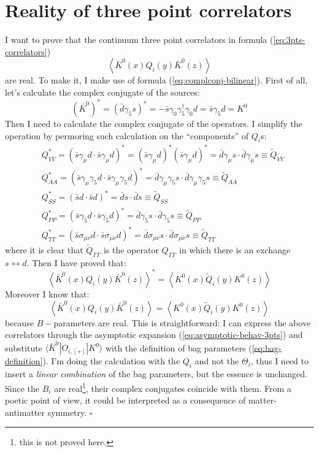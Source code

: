 \documentclass[english, LaM, oneside, noexaminfo]{sapthesis}
\newcommand{\la}{\langle}
\newcommand{\ra}{\rangle}
\newcommand{\proved}{\newline \hspace*{.97\textwidth} $\square$}
\begin{document}
\section{Reality of three point correlators}\label{app:proof-reality-3pts}
\noindent
I want to prove that the continuum three point correlators in formula (\ref{eq:3pts-correlators})
$$ \left\la \bar K^0 (x) Q_i (y) \bar K^0 (z) \right\ra $$
are real. To make it, I make use of formula (\ref{eq:complconj-bilinear}).
First of all, let's calculate the complex conjugate of the sources: 
\begin{equation*}
    (\bar K^{0})^* = (\bar d \gamma_5 s)^* = - \bar s \gamma_0 \gamma_5^\dagger \gamma_0 d = \bar s  \gamma_5 d = K^0
\end{equation*}
Then I need to calculate the complex conjugate of the operators.
I simplify the operation by permoring such calculation on the ``components'' of $Q_i$s:
\begin{equation*}
    \begin{aligned}
        & Q_{VV}^* = \left(\bar s \gamma_\mu d \cdot \bar s \gamma_\mu d\right)^* = \left(\bar s \gamma_\mu d\right)^* \left(\bar s \gamma_\mu d\right)^* = \bar d \gamma_\mu s \cdot \bar d \gamma_\mu s \equiv \tilde{Q}_{VV} \\
        & Q_{AA}^* = \left(\bar s \gamma_\mu \gamma_5 d \cdot \bar s \gamma_\mu \gamma_5 d\right)^* = \bar d \gamma_\mu\gamma_5 s \cdot \bar d \gamma_\mu\gamma_5 s \equiv \tilde{Q}_{AA} \\
        & Q_{SS}^* = \left(\bar s  d \cdot \bar s d\right)^* = \bar d  s \cdot \bar d s \equiv \tilde{Q}_{SS} \\
        & Q_{PP}^* = \left(\bar s \gamma_5 d \cdot \bar s \gamma_5 d\right)^* = \bar d \gamma_5 s \cdot \bar d \gamma_5 s \equiv \tilde{Q}_{PP} \\
        & Q_{TT}^* = \left(\bar s \sigma_{\mu\nu} d \cdot \bar s \sigma_{\mu\nu} d\right)^* = \bar d \sigma_{\mu\nu} s \cdot \bar d \sigma_{\mu\nu} s \equiv \tilde{Q}_{TT}
    \end{aligned}
\end{equation*}
where it is clear that $\tilde Q_{\Gamma\Gamma}$ is the operator $Q_{\Gamma\Gamma}$ in which there is an exchange $s \leftrightarrow d$.
Then I have proved that:
$$ \left\la \bar K^0 (x) Q_i (y) \bar K^0 (z) \right\ra^* = \left\la  K^0 (x) \tilde{Q}_i (y) K^0 (z) \right\ra $$
Moreover I know that:
$$ \left\la \bar K^0 (x) Q_i (y) \bar K^0 (z) \right\ra = \left\la  K^0 (x) \tilde{Q}_i (y) K^0 (z) \right\ra $$
because $B-$parameters are real.
This is straightforward: I can express the above correlators through the asymptotic expansion (\ref{eq:asymptotic-behav-3pts}) and substitute $\la \bar K^0 | O_{i,[+]} | K^0 \ra$ with the definition of bag parameters (\ref{eq:bag-definition}).
I'm doing the calculation with the $Q_i$ and not the $\Theta_i$, thus I need to insert a {\it linear combination} of the bag parameters, but the essence is unchanged.
Since the $B_i$ are real\footnote{this is not proved here.}, their complex conjugates coincide with them.
From a poetic point of view, it could be interpreted as a consequence of matter-antimatter symmetry. 
\proved
\end{document}
